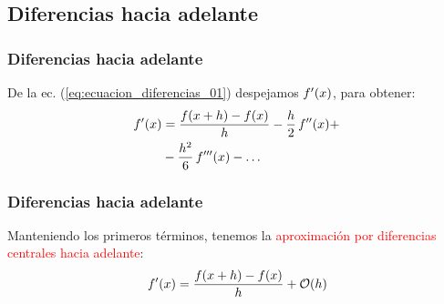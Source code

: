 \subsection*{Diferencias hacia adelante}
\begin{frame}
\frametitle{Diferencias hacia adelante}
De la ec. (\ref{eq:ecuacion_diferencias_01}) despejamos ${f}^{\prime} (x)$, para obtener:
\begin{align*}
{f}^{\prime} (x) &= \dfrac{f(x + h) - f(x)}{h} - \dfrac{h}{2} \, {f}^{\prime \prime} (x) + \\
&- \dfrac{h^{2}}{6} \, {f}^{\prime \prime \prime} (x) - \ldots
\end{align*}
\end{frame}
\begin{frame}
\frametitle{Diferencias hacia adelante}
Manteniendo los primeros términos, tenemos la \textcolor{red}{aproximación por diferencias centrales hacia adelante}:
\begin{align}
\ptilde{f} (x) = \dfrac{f(x + h) - f(x)}{h} + \order{h}
\label{eq:ecuacion_5_05}
\end{align}
\end{frame}
